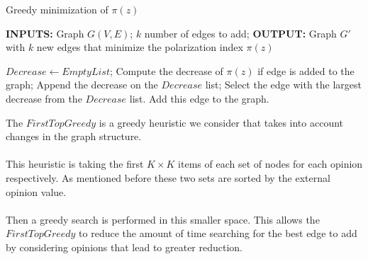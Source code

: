     		\begin{algorithm}[H]
		
			\caption{Greedy minimization of $\pi(z)$}
			\label{alg:greedyAlgo}
			
			\begin{flushleft}
        				\textbf{INPUTS:} Graph $G(V, E)$; $k$ number of edges to add;
				\vspace{6pt}
        				\textbf{OUTPUT:} Graph $G'$ with $k$ new edges that minimize the polarization index $\pi(z)$
			\end{flushleft}
			
			\begin{algorithmic}[1]
					\STATE$Decrease \leftarrow Empty List$;
						\STATE Compute the decrease of $\pi(z)$ if edge is added to the graph;
						\STATE Append the decrease on the $Decrease$ list;
					\ENDFOR
					\STATE Select the edge with the largest decrease from the $Decrease$ list.
					\STATE Add this edge to the graph.
				\ENDFOR
			\end{algorithmic}
			
		\end{algorithm}

\vspace{10pt}
\clearpage



\noindent The $FirstTopGreedy$ is a greedy heuristic we consider that takes into account changes in the graph structure. 
\\
\\
This heuristic is taking the first $K \times K$ items of each set of nodes for each opinion respectively. As mentioned before these two sets are sorted by the external opinion value. 
\\
\\
Then a greedy search is performed in this smaller space. This allows the $FirstTopGreedy$ to reduce the amount of time searching for the best edge to add by considering opinions that lead to greater reduction.
\\
\\


